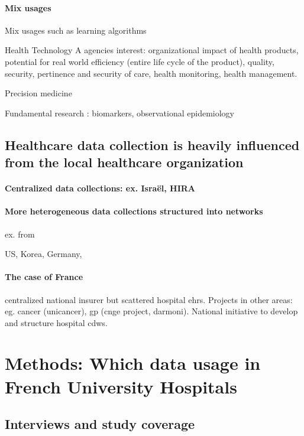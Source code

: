 \documentclass{report}
\begin{document}
\paragraph{Mix usages}

Mix usages such as learning algorithms

Health Technology A agencies interest: organizational impact of health products, potential for real world efficiency (entire life cycle of the product), quality, security, pertinence and security of care, health monitoring, health management.

Precision medicine

Fundamental research : biomarkers, observational epidemiology

\subsection{Healthcare data collection is heavily influenced from the local healthcare organization}

\paragraph{Centralized data collections: ex. Israël, HIRA}

\paragraph{More heterogeneous data collections structured into networks} ex. from

US, Korea, Germany,

\paragraph{The case of France}

centralized national insurer but scattered hospital ehrs. Projects in other areas: eg. cancer (unicancer), gp (cnge project, darmoni). National initiative to develop and structure hospital cdws.


\section{Methods: Which data usage in French University Hospitals}\label{sec:cdw:methods}

\subsection{Interviews and study coverage}\label{subsec:cdw:interviews}
\end{document}
